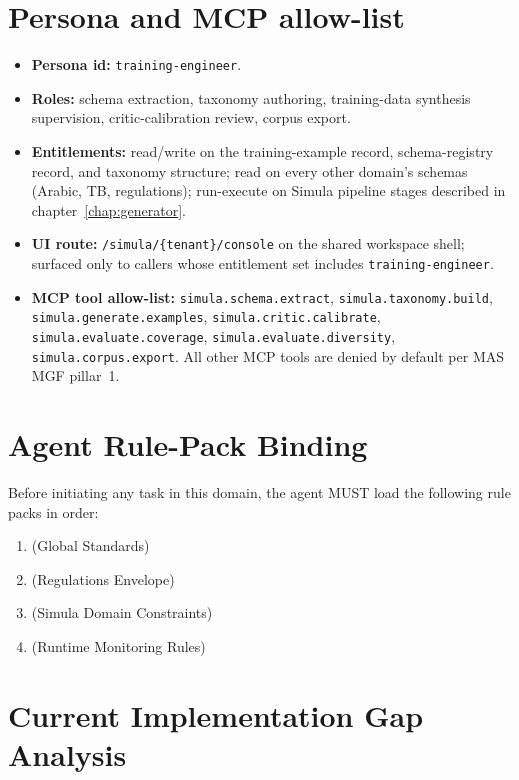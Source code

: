 \documentclass[12pt,a4paper,twoside]{report}
\begin{document}
\section{Persona and MCP allow-list}
\label{sec:agent-persona}
\begin{itemize}
\item \textbf{Persona id:} \texttt{training-engineer}.
\item \textbf{Roles:} schema extraction, taxonomy authoring,
training-data synthesis supervision, critic-calibration review,
corpus export.
\item \textbf{Entitlements:} read/write on the training-example
record, schema-registry record, and taxonomy structure; read on
every other domain's schemas (Arabic, TB, regulations);
run-execute on Simula pipeline stages described in
chapter~\ref{chap:generator}.
\item \textbf{UI route:} \texttt{/simula/\{tenant\}/console} on the
shared workspace shell; surfaced only to callers whose
entitlement set includes \texttt{training-engineer}.
\item \textbf{MCP tool allow-list:}
\texttt{simula.schema.extract}, \texttt{simula.taxonomy.build},
\texttt{simula.generate.examples},
\texttt{simula.critic.calibrate},
\texttt{simula.evaluate.coverage},
\texttt{simula.evaluate.diversity},
\texttt{simula.corpus.export}. All other MCP tools are denied by
default per MAS MGF pillar~1.
\end{itemize}

\section{Agent Rule-Pack Binding}
\label{sec:agent-rule-binding}
Before initiating any task in this domain, the agent MUST load the following rule packs in order:
\begin{enumerate}
\item {} (Global Standards)
\item {} (Regulations Envelope)
\item {} (Simula Domain Constraints)
\item {} (Runtime Monitoring Rules)
\end{enumerate}

\section{Current Implementation Gap Analysis}
\label{sec:current-gap-analysis}
\end{document}
